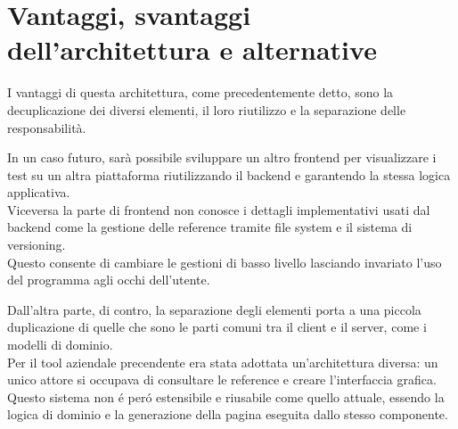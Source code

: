     \section{Vantaggi, svantaggi dell'architettura e alternative}
        I vantaggi di questa architettura, come precedentemente detto, sono la decuplicazione dei diversi elementi, il loro riutilizzo e la separazione delle responsabilità.
        
        In un caso futuro, sarà possibile sviluppare un altro frontend per visualizzare i test su un altra piattaforma riutilizzando il backend e garantendo la stessa logica applicativa.\\
        Viceversa la parte di frontend non conosce i dettagli implementativi usati dal backend come la gestione delle reference tramite file system e il sistema di versioning.\\
        Questo consente di cambiare le gestioni di basso livello lasciando invariato l'uso del programma agli occhi dell'utente.  
        
        Dall'altra parte, di contro, la separazione degli elementi porta a una piccola duplicazione di quelle che sono le parti comuni tra il client e il server, come i modelli di dominio.\\
        Per il tool aziendale precendente era stata adottata un'architettura diversa: un unico attore si occupava di consultare le reference e creare l'interfaccia grafica. \\
        Questo sistema non \'e per\'o estensibile e riusabile come quello attuale, essendo la logica di dominio e la generazione della pagina eseguita dallo stesso componente.
